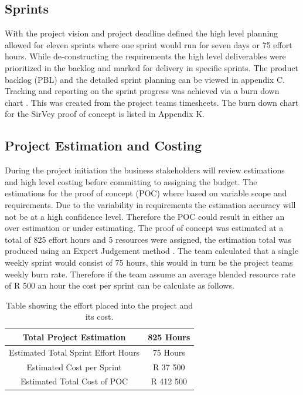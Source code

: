\documentclass[12pt]{witseiepaper}
\begin{document}
\subsection{Sprints}

With the project vision and project deadline defined the high level planning allowed for eleven sprints \cite{ExpertJudgement} where one sprint would run for seven days or 75 effort hours. While de-constructing the requirements the high level deliverables were prioritized in the backlog and marked for delivery in specific sprints. The product backlog (PBL) and the detailed sprint planning can be viewed in appendix C. Tracking and reporting on the sprint progress was achieved via a burn down chart \cite{SCUMMaster}. This was created from the project teams timesheets. The burn down chart for the SirVey proof of concept is listed in Appendix K.


\subsection{Project Estimation and Costing}
During the project initiation the business stakeholders will review estimations and high level costing before committing to assigning the budget. \cite{ExpertJudgement} The estimations for the proof of concept (POC) where based on variable scope and requirements. Due to the variability in requirements the estimation accuracy will not be at a high confidence level. Therefore the POC could result in either an over estimation or under estimating. The proof of concept was estimated at a total of 825 effort hours and 5 resources were assigned, the estimation total was produced using an Expert Judgement method \cite{ExpertJudgement}. The team calculated that a single weekly sprint would consist of 75 hours, this would in turn be the project teams weekly burn rate. Therefore if the team assume an average blended resource rate of R 500 an hour the cost per sprint can be calculate as follows.

\begin{table}[htb] \caption{Table showing the effort placed into the project and its cost.} \label{tbl:cost} 
    \begin{center}
  \begin{tabular}
     {|c|c|} %
    \hline Total Project Estimation &825 Hours\\
    \hline Estimated Total Sprint Effort Hours &75 Hours\\
    \hline Estimated Cost per Sprint &R 37 500\\
    \hline Estimated Total Cost of POC & R 412 500 \\
    \hline 
  \end{tabular}
      \end{center}
\end{table}
\end{document}
